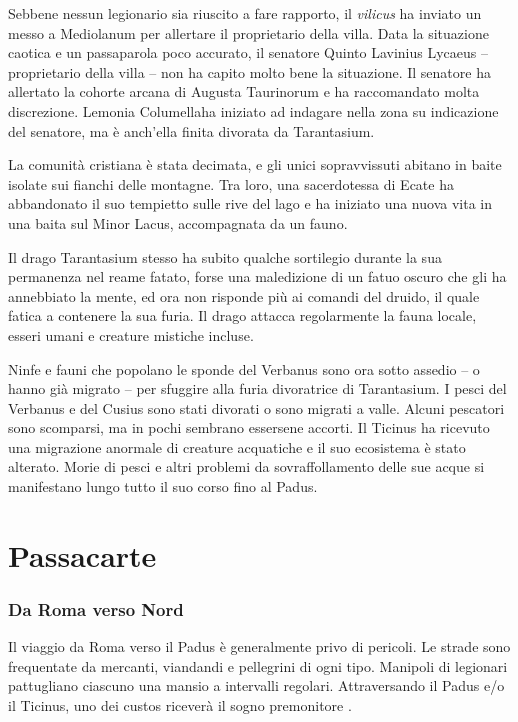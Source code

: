 \documentclass[11.5pt,twocolumn]{article}
\newcommand\custosmorta{Lemonia Columella}
\begin{document}
Sebbene nessun legionario sia riuscito a fare rapporto, il \emph{vilicus} ha inviato un messo a Mediolanum per allertare il proprietario della villa.
Data la situazione caotica e un passaparola poco accurato, il senatore Quinto Lavinius Lycaeus -- proprietario della villa -- non ha capito molto bene la situazione.
Il senatore ha allertato la cohorte arcana di Augusta Taurinorum e ha raccomandato molta discrezione.
\custosmorta ha iniziato ad indagare nella zona su indicazione del senatore, ma \`{e} anch'ella finita divorata da Tarantasium.

La comunit\`{a} cristiana \`{e} stata decimata, e gli unici sopravvissuti abitano in baite isolate sui fianchi delle montagne.
Tra loro, una sacerdotessa di Ecate ha abbandonato il suo tempietto sulle rive del lago e ha iniziato una nuova vita in una baita sul Minor Lacus, accompagnata da un fauno.

Il drago Tarantasium stesso ha subito qualche sortilegio durante la sua permanenza nel reame fatato, forse una maledizione di un fatuo oscuro che gli ha annebbiato la mente, ed ora non risponde pi\`{u} ai comandi del druido, il quale fatica a contenere la sua furia.
Il drago attacca regolarmente la fauna locale, esseri umani e creature mistiche incluse.

Ninfe e fauni che popolano le sponde del Verbanus sono ora sotto assedio -- o hanno gi\`{a} migrato -- per sfuggire alla furia divoratrice di Tarantasium.
I pesci del Verbanus e del Cusius sono stati divorati o sono migrati a valle.
Alcuni pescatori sono scomparsi, ma in pochi sembrano essersene accorti.
Il Ticinus ha ricevuto una migrazione anormale di creature acquatiche e il suo ecosistema \`{e} stato alterato.
Morie di pesci e altri problemi da sovraffollamento delle sue acque si manifestano lungo tutto il suo corso fino al Padus.

\part{Passacarte}

\section{Da Roma verso Nord}
%
Il viaggio da Roma verso il Padus \`{e} generalmente privo di pericoli.
Le strade sono frequentate da mercanti, viandandi e pellegrini di ogni tipo.
Manipoli di legionari pattugliano ciascuno una mansio a intervalli regolari.
Attraversando il Padus e/o il Ticinus, uno dei custos ricever\`{a} il sogno premonitore .
\end{document}
